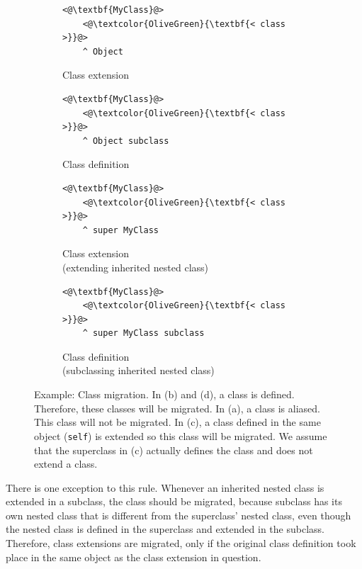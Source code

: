 \begin{figure}[!htp]
\centering
\begin{subfigure}[b]{0.45\textwidth}
\begin{lstlisting}
<@\textbf{MyClass}@>
    <@\textcolor{OliveGreen}{\textbf{< class >}}@>
    ^ Object
\end{lstlisting}
\caption{Class extension}
\label{fig:impl_cls_migr_ext}
\end{subfigure}
\qquad
\begin{subfigure}[b]{0.45\textwidth}
\begin{lstlisting}
<@\textbf{MyClass}@>
    <@\textcolor{OliveGreen}{\textbf{< class >}}@>
    ^ Object subclass
\end{lstlisting}
\caption{Class definition}
\label{fig:impl_cls_migr_def}
\end{subfigure}

\vspace{10pt}

\begin{subfigure}[b]{0.45\textwidth}
\begin{lstlisting}
<@\textbf{MyClass}@>
    <@\textcolor{OliveGreen}{\textbf{< class >}}@>
    ^ super MyClass
\end{lstlisting}
\caption{Class extension \\ (extending inherited nested class)}
\label{fig:impl_cls_migr_ext_nested}
\end{subfigure}
\qquad
\begin{subfigure}[b]{0.45\textwidth}
\begin{lstlisting}
<@\textbf{MyClass}@>
    <@\textcolor{OliveGreen}{\textbf{< class >}}@>
    ^ super MyClass subclass
\end{lstlisting}
\caption{Class definition \\ (subclassing inherited nested class)}
\label{fig:impl_cls_migr_subclass_nested}
\end{subfigure}
\caption[Example: Class migration]{Example: Class migration. In (b) and (d), a class is defined. Therefore, these classes will be migrated. In (a), a class is aliased. This class will not be migrated. In (c), a class defined in the same object (\texttt{self}) is extended so this class will be migrated. We assume that the superclass in (c) actually defines the class and does not extend a class.}
\label{fig:impl_cls_migration_full}
\end{figure}

There is one exception to this rule. Whenever an inherited nested class is extended in a subclass, the class should be migrated, because subclass has its own nested class that is different from the superclass' nested class, even though the nested class is defined in the superclass and extended in the subclass. Therefore, class extensions are migrated, only if the original class definition took place in the same object as the class extension in question.

